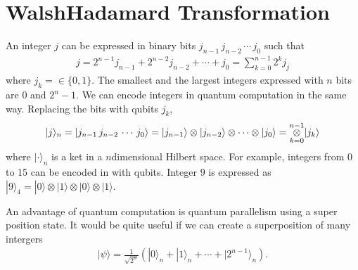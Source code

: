 \documentclass[letterpaper,10pt,english]{jupyterBook}
\begin{document}
\sphinxstepscope


\section{Walsh\sphinxhyphen{}Hadamard Transformation}
\label{\detokenize{algorithms/walshhadamard:walsh-hadamard-transformation}}\label{\detokenize{algorithms/walshhadamard:sec-walsh-hadamard}}\label{\detokenize{algorithms/walshhadamard::doc}}
\sphinxAtStartPar
An integer \(j\) can be expressed in binary bits \(j_{n-1}\,j_{n-2}\,\cdots\,j_{0}\) such that
\begin{equation*}
\begin{split}
j = 2^{n-1} j_{n-1} + 2^{n-2} j_{n-2} + \cdots + j_0 = \sum_{k=0}^{n-1} 2^k j_j
\end{split}
\end{equation*}
\sphinxAtStartPar
where \(j_k = \in \{0,1\}\). The smallest and the largest integers expressed with \(n\) bits are \(0\) and \(2^{n}-1\).  We can encode integers in quantum computation in the same way.  Replacing the bits with qubits \(j_k\),
\begin{equation*}
\begin{split}
|j\rangle_n = |j_{n-1}\,j_{n-2}\,\cdots\,j_{0} \rangle = |j_{n-1} \rangle \otimes  |j_{n-2} \rangle \otimes \cdots \otimes |j_{0}\rangle = \underset{k=0}{\overset{n-1}{\Large\otimes}} |j_k\rangle
\end{split}
\end{equation*}
\sphinxAtStartPar
where \(|\cdot\rangle_n\) is a ket in a \(n\)\sphinxhyphen{}dimensional Hilbert space.
For example, integers from 0 to 15 can be encoded in with qubits. Integer \(9\) is expressed as \(|9\rangle_4 = |0\rangle \otimes |1\rangle \otimes |0\rangle \otimes |1\rangle\).

\sphinxAtStartPar
An advantage of quantum computation is quantum parallelism using a super position state. It would be quite useful if we can create a superposition of many intergers
\begin{equation*}
\begin{split}
|\psi\rangle = \frac{1}{\sqrt{2^n}}\left(|0\rangle_n + |1\rangle_n + \cdots + |2^{n-1}\rangle_n \right).
\end{split}
\end{equation*}
\end{document}
